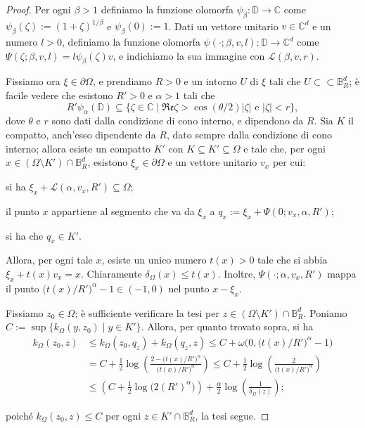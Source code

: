 \begin{proof}
    Per ogni $\beta>1$ definiamo la funzione olomorfa $\psi_\beta:\mathbb{D}\longrightarrow\mathbb{C}$ come $\psi_\beta(\zeta):=(1+\zeta)^{1/\beta}$ e $\psi_\beta(0):=1$. Dati un vettore unitario $v\in\mathbb{C}^d$ e un numero $l>0$, definiamo la funzione olomorfa $\psi(\cdot;\beta,v,l):\mathbb{D}\longrightarrow\mathbb{C}^d$ come $\Psi(\zeta;\beta,v,l)=l\psi_\beta(\zeta)v$, e indichiamo la sua immagine con $\mathcal{L}(\beta,v,r)$.
    
    Fissiamo ora $\xi\in\partial\Omega$, e prendiamo $R>0$ e un intorno $U$ di $\xi$ tali che $U\subset\subset\mathbb{B}^d_R$; è facile vedere che esistono $R'>0$ e $\alpha>1$ tali che
    $$R'\psi_\alpha(\mathbb{D})\subseteq \{\zeta\in\mathbb{C}\mid\mathfrak{Re}\zeta>\cos(\theta/2)|\zeta|\text{ e }|\zeta|<r\},$$
    dove $\theta$ e $r$ sono dati dalla condizione di cono interno, e dipendono da $R$. Sia $K$ il compatto, anch'esso dipendente da $R$, dato sempre dalla condizione di cono interno; allora esiste un compatto $K'$ con $K\subseteq K'\subseteq\Omega$ e tale che, per ogni $x\in(\Omega\setminus K')\cap\mathbb{B}^d_R$, esistono $\xi_x\in\partial\Omega$ e un vettore unitario $v_x$ per cui:
    \begin{nlist}
        \item si ha $\xi_x+\mathcal{L}(\alpha,v_x,R')\subseteq\Omega$;
        \item il punto $x$ appartiene al segmento che va da $\xi_x$ a $q_x:=\xi_x+\Psi(0;v_x,\alpha,R')$;
        \item si ha che $q_x\in K'$.
    \end{nlist}

    Allora, per ogni tale $x$, esiste un unico numero $t(x)>0$ tale che si abbia $\xi_x+t(x)v_x=x$. Chiaramente $\delta_\Omega(x)\le t(x)$. Inoltre, $\Psi(\cdot;\alpha,v_x,R')$ mappa il punto $\big(t(x)/R'\big)^\alpha-1\in(-1,0)$ nel punto $x-\xi_x$.

    Fissiamo $z_0\in\Omega$; è sufficiente verificare la tesi per $z\in (\Omega\setminus K')\cap \mathbb{B}^d_R$. Poniamo $C:=\sup\{k_\Omega(y,z_0)\mid y\in K'\}$. Allora, per quanto trovato sopra, si ha
    \begin{align*}
        k_\Omega(z_0,z)&\le k_\Omega(z_0,q_z)+k_\Omega(q_z,z) \le C+\omega\Big(0,\big(t(x)/R'\big)^\alpha-1\Big)\\
        &=C+\frac{1}{2}\log\left(\frac{2-\big(t(x)/R'\big)^\alpha}{\big(t(x)/R'\big)^\alpha}\right) \le C+\frac{1}{2}\log\left(\frac{2}{\big(t(x)/R'\big)^\alpha}\right)\\
        &\le \left(C+\frac{1}{2}\log\big(2(R')^\alpha\big)\right)+\frac{\alpha}{2}\log\left(\frac{1}{\delta_\Omega(z)}\right);
    \end{align*}

    poiché $k_\Omega(z_0,z) \le C$ per ogni $z\in K'\cap\mathbb{B}^d_R$, la tesi segue.
\end{proof}

